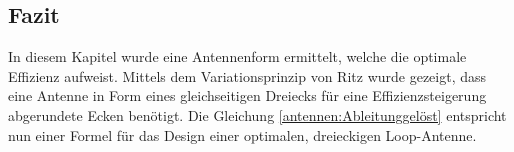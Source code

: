 \subsection{Fazit\label{antennen:fazit}}
In diesem Kapitel wurde eine Antennenform ermittelt, welche die optimale Effizienz aufweist. Mittels dem Variationsprinzip von Ritz wurde gezeigt, dass eine Antenne in Form eines gleichseitigen Dreiecks für eine Effizienzsteigerung abgerundete Ecken benötigt. Die Gleichung \eqref{antennen:Ableitunggelöst} entspricht nun einer Formel für das Design einer optimalen, dreieckigen Loop-Antenne. 
